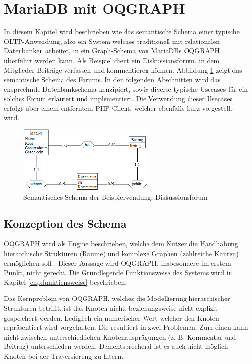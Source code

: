 \section{MariaDB mit OQGRAPH}%
In diesem Kapitel wird beschrieben wie das semantische Schema einer typische OLTP-Anwendung, also ein System welches traditionell mit relationalen Datenbanken arbeitet, in ein Graph-Schema von MariaDBs OQGRAPH überführt werden kann. Als Beispiel dient ein Diskussionsforum, in dem Mitglieder Beiträge verfassen und kommentieren können. Abbildung \ref{fig:semanticSchema} zeigt das semantische Schema des Forums. In den folgenden Abschnitten wird das ensprechnde Datenbankschema konzipiert, sowie diverse typische Usecases für ein solches Forum erläutert und implementiert. Die Verwendung dieser Usecases erfolgt über einem entferntem PHP-Client, welcher ebenfalls kurz vorgestellt wird.

\begin{figure}[h]
	\centering
	\includegraphics[width=0.6\textwidth]{images/semantischesSchema.png}	
	\caption{Semantisches Schema der Beispielwendung: Diskussionsforum}
	\label{fig:semanticSchema}
\end{figure}

\subsection{Konzeption des Schema}
OQGRAPH wird als Engine beschrieben, welche dem Nutzer die Handhabung hierarchische Strukturen (Bäume) und komplexe Graphen (zahlreiche Kanten) ermöglichen soll \cite{oqgraph}. Dieser Aussage wird OQGRAPH, insbesondere im erstem Punkt, nicht gerecht. Die Grundlegende Funktionsweise des Systems wird in Kapitel \ref{chp:funktionsweise} beschrieben.

Das Kernproblem von OQGRAPH, welches die Modellierung hierarchischer Strukturen betrifft, ist das Knoten nicht, beziehungsweise nicht explizit gespeichert werden. Lediglich ein numerischer Wert welcher den Knoten repräsentiert wird vorgehalten. Die resultiert in zwei Problemen. Zum einen kann nicht zwischen unterschiedlichen Knotenausprägungen (z. B. Kommentar und Beitrag) unterschieden werden. Dementsprechend ist es auch nicht möglich Knoten bei der Traversierung zu filtern. 

